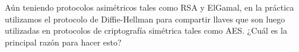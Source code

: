 
Aún teniendo protocolos asimétricos tales como RSA y ElGamal, en la práctica utilizamos el protocolo de Diffie-Hellman para compartir llaves que son luego utilizadas en protocolos de criptografía simétrica tales como AES. ¿Cuál es la principal razón para hacer esto?


